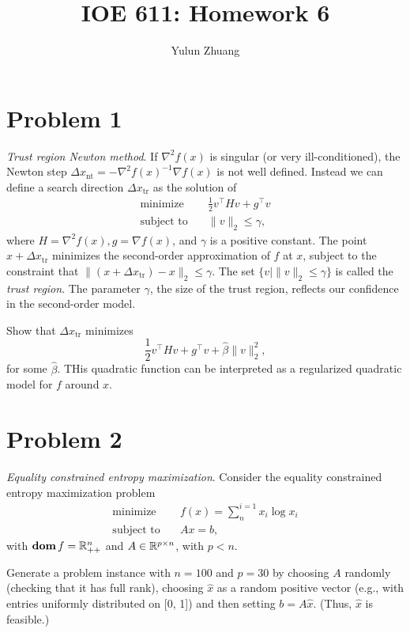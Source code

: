 \documentclass[11pt]{article}
\newcommand{\grad}{\nabla}
\newcommand{\hess}{\nabla^2}
\newcommand{\half}{\frac{1}{2}} %
\newcommand{\inv}{^{-1}}        %
\newcommand{\T}{^\top}          %
\begin{document}
\title{IOE 611: Homework 6}
\author{Yulun Zhuang}
\maketitle
\section*{Problem 1}
\textit{Trust region Newton method}.
If $\hess f(x)$ is singular (or very ill-conditioned), the Newton step $\Delta x_{\text{nt}} = -\hess f(x)\inv \grad f(x)$ is not well defined. Instead we can define a search direction $\Delta x_{\text{tr}}$ as the solution of
\begin{align*}
    \text{minimize}\quad & \half v\T H v + g\T v\\
    \text{subject to}\quad & \|v\|_2 \leq \gamma,
\end{align*}
where $H = \hess f(x), g = \grad f(x)$, and $\gamma$ is a positive constant. The point $x + \Delta x_{\text{tr}}$ minimizes the second-order approximation of $f$ at $x$, subject to the constraint that $\| (x + \Delta x_{\text{tr}}) - x\|_2 \leq \gamma$. The set $\{v \mid \|v\|_2\leq \gamma\}$ is called the \textit{trust region}. The parameter $\gamma$, the size of the trust region, reflects our confidence in the second-order model.

Show that $\Delta x_{\text{tr}}$ minimizes
\[
    \half v\T H v + g\T v + \hat \beta \|v\|_2^2,
\]
for some $\hat \beta$. THis quadratic function can be interpreted as a regularized quadratic model for $f$ around $x$.



\clearpage
\section*{Problem 2}
\textit{Equality constrained entropy maximization}. Consider the equality constrained entropy maximization problem
\begin{align*}
    \text{minimize}\quad & f(x) = \sum_{n}^{i=1} x_i \log x_i\\
    \text{subject to}\quad & Ax = b,
\end{align*}
with $\mathop{\textbf{dom}} f = {{\mathbb{R}}}^n_{++}$ and $A\in{{\mathbb{R}}}^{p\times n}$, with $p < n$.

Generate a problem instance with $n = 100$ and $p = 30$ by choosing $A$ randomly (checking that it has full rank), choosing $\hat x$ as a random positive vector (e.g., with entries uniformly distributed on [0, 1]) and then setting $b = A\hat x$. (Thus, $\hat x$ is feasible.)
\end{document}
